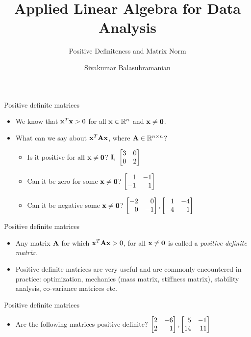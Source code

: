 \documentclass[aspectratio=169]{beamer}
\title{Applied Linear Algebra for Data Analysis}
\subtitle{Positive Definiteness and Matrix Norm}
\author{Sivakumar Balasubramanian}
\institute[Christian Medical College] %
{
  \inst{}%
  Department of Bioengineering\\
  Christian Medical College, Bagayam\\
  Vellore 632002
}
\date{}
\let\olditem\item
\renewcommand{\item}{\setlength{\itemsep}{\fill}\olditem}
\def\mf{\ensuremath\mathbf}
\def\mb{\ensuremath\mathbb}
\def\bmx{\ensuremath\begin{bmatrix*}[r]}
\def\emx{\ensuremath\end{bmatrix*}}
\begin{document}
\begin{frame}
  \titlepage
\end{frame}

\begin{frame}[t]{Positive definite matrices}
\begin{itemize}
    \item We know that $\mf{x}^T\mf{x} > 0$ for all $\mf{x} \in \mb{R}^n$ and $\mf{x} \neq \mf{0}$.

    \item What can we say about $\mf{x}^T\mf{Ax}$, where $\mf{A} \in \mb{R}^{n \times n}$?
    \begin{itemize}
        \item Is it positive for all $\mf{x} \neq \mf{0}$?
        $\mf{I}, \,\, \bmx3 & 0\\0 & 2\emx$ 
        \item Can it be zero for some $\mf{x} \neq \mf{0}$? 
        $\bmx1 & -1\\-1 & 1\emx$
        \item Can it be negative some $\mf{x} \neq \mf{0}$? 
        $\bmx-2 & 0\\0 & -1\emx, \bmx1 & -4\\-4 & 1\emx$
    \end{itemize}
\end{itemize}
\end{frame}


\begin{frame}[t]{Positive definite matrices}
\begin{itemize}
    \item Any matrix $\mf{A}$ for which $\mf{x}^T\mf{A}\mf{x} > 0$, for all $\mf{x} \neq \mf{0}$ is called a \textit{positive definite matrix}.

    \item Positive definite matrices are very useful and are commonly encountered in practice: optimization, mechanics (mass matrix, stiffness matrix), stability analysis, co-variance matrices etc.
\end{itemize}
\end{frame}


\begin{frame}[t]{Positive definite matrices}
\begin{itemize}
    \item Are the following matrices positive definite? $\bmx 2 & -6\\2 & 1\emx, \bmx 5 & -1\\14 & 11\emx$ 
\end{itemize}
\end{frame}
\end{document}

